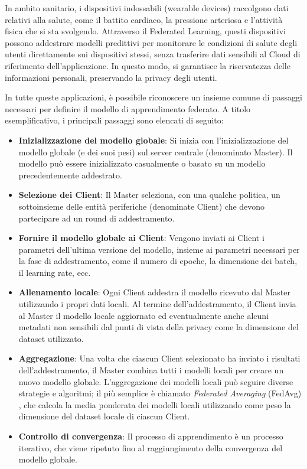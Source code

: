 \documentclass[a4paper, oneside, openright]{report}
\begin{document}
In ambito sanitario, i dispositivi indossabili (wearable devices) raccolgono dati relativi alla salute, come il battito cardiaco, la pressione arteriosa e l’attività fisica che si sta svolgendo. Attraverso il Federated Learning, questi dispositivi possono addestrare modelli predittivi per monitorare le condizioni di salute degli utenti direttamente sui dispositivi stessi, senza trasferire dati sensibili al Cloud di riferimento dell'applicazione. In questo modo, si garantisce la riservatezza delle informazioni personali, preservando la privacy degli utenti.

In tutte queste applicazioni, è possibile riconoscere un insieme comune di passaggi necessari per definire il modello di apprendimento federato. A titolo esemplificativo, i principali passaggi sono elencati di seguito:
    \begin{itemize}
        \item \textbf{Inizializzazione del modello globale}: Si inizia con l'inizializzazione del modello globale (e dei suoi pesi) sul server centrale (denominato Master). Il modello può essere inizializzato casualmente o basato su un modello precedentemente addestrato.
    
        \item \textbf{Selezione dei Client}: Il Master seleziona, con una qualche politica, un sottoinsieme delle entità periferiche (denominate Client) che devono partecipare ad un round di addestramento.
    
        \item \textbf{Fornire il modello globale ai Client}: 
        Vengono inviati ai Client i parametri dell'ultima versione del modello, insieme ai parametri necessari per la fase di addestramento, come il numero di epoche, la dimensione dei batch, il learning rate, ecc.
    
        \item \textbf{Allenamento locale}: Ogni Client addestra il modello ricevuto dal Master utilizzando i propri dati locali. Al termine dell'addestramento, il Client invia al Master il modello locale aggiornato ed eventualmente anche alcuni metadati non sensibili dal punti di vista della privacy come la dimensione del dataset utilizzato.
        
        \item \textbf{Aggregazione}: 
         Una volta che ciascun Client selezionato ha inviato i risultati dell'addestramento, il Master combina tutti i modelli locali per creare un nuovo modello globale. L'aggregazione dei modelli locali può seguire diverse strategie e algoritmi; il più semplice è chiamato \textit{Federated Averaging} (FedAvg) \cite{DBLP:journals/corr/McMahanMRA16}, che calcola la media ponderata dei modelli locali utilizzando come peso la dimensione del dataset locale di ciascun Client.

        \item \textbf{Controllo di convergenza}: Il processo di apprendimento è un processo iterativo, che viene ripetuto fino al raggiungimento della convergenza del modello globale.
        
    \end{itemize}
\end{document}
